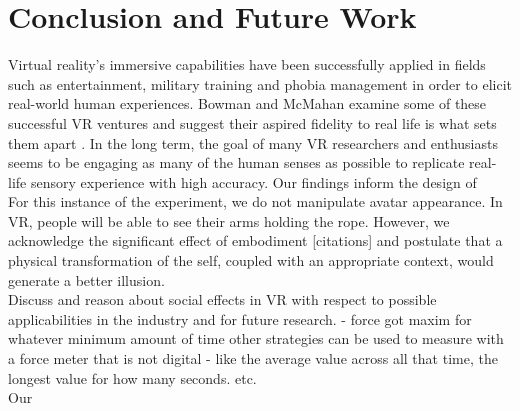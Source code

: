 \section{Conclusion and Future Work}

Virtual reality's immersive capabilities have been successfully applied in fields such as entertainment, military training and phobia management in order to elicit real-world human experiences. Bowman and McMahan examine some of these successful VR ventures and suggest their aspired fidelity to real life is what sets them apart \cite{bowman2007virtual}. In the long term, the goal of many VR researchers and enthusiasts seems to be engaging as many of the human senses as possible to replicate real-life sensory experience with high accuracy. Our findings inform the design of 
\\
For this instance of the experiment, we do not manipulate avatar appearance. In VR, people will be able to see their arms holding the rope. However, we acknowledge the significant effect of embodiment [citations] and postulate that a physical transformation of the self, coupled with an appropriate context, would generate a better illusion.
\\
Discuss and reason about social effects in VR with respect to possible applicabilities in
the industry and for future research.
- force got maxim for whatever minimum amount of time other strategies can be used to measure with a force meter that is not digital - like the average value across all that time, the longest value for how many seconds. etc.
\\
Our

